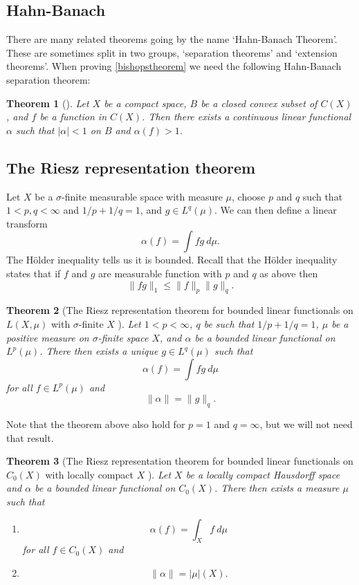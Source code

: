 \documentclass[a4paper,12pt,twoside,BCOR=10mm]{scrbook}
\newtheorem{theorem}{Theorem}[section]
\theoremstyle{definition}
\theoremstyle{definition}
\theoremstyle{definition}
\begin{document}
\subsection{Hahn-Banach}
There are many related theorems going by the name `Hahn-Banach Theorem'.
These are sometimes split in two groups, `separation theorems' and `extension theorems'.
When proving \ref{bishopstheorem} we need the following Hahn-Banach separation theorem:
\begin{theorem}[\citep{pryce}]
Let
	$X$ be a compact space,
	$B$ be a closed convex subset of $C(X)$,
	and $f$ be a function in $C(X)$.
Then there exists a continuous linear functional $\alpha$ such that $|\alpha| < 1$ on $B$ and $\alpha(f) > 1$.
\end{theorem}
\subsection{The Riesz representation theorem}
Let $X$ be a $\sigma$-finite measurable space with measure $\mu$, choose $p$ and $q$ such that $1 < p, q < \infty$ and $1/p + 1/q = 1$, and $g \in L^q(\mu)$.
We can then define a linear transform
\[
	\alpha(f) = \int fg\ d\mu.
\]
The Hölder inequality tells us it is bounded.
Recall that the Hölder inequality states that if $f$ and $g$ are measurable function with $p$ and $q$ as above then
\[
	\|fg\|_1 \leq \|f\|_p\|g\|_q.
\]
\begin{theorem}[The Riesz representation theorem for bounded linear functionals on $L(X, \mu)$ with $\sigma$-finite $X$ \citep{rudin2}]
Let $1 < p < \infty$,
	$q$ be such that $1/p + 1/q = 1$,
	$\mu$ be a positive measure on $\sigma$-finite space $X$,
	and $\alpha$ be a bounded linear functional on $L^p(\mu)$.
There then exists a unique $g \in L^q(\mu)$ such that
\[
	\alpha(f) = \int fg\ d\mu
\]
for all $f \in L^p(\mu)$ and
\[
	\|\alpha\| = \|g\|_q.
\]
\end{theorem}
Note that the theorem above also hold for $p = 1$ and $q = \infty$, but we will not need that result.

\begin{theorem}[The Riesz representation theorem for bounded linear functionals on $C_0(X)$ with locally compact $X$ \citep{rudin2}]
\label{riesz}
Let $X$ be a locally compact Hausdorff space and $\alpha$ be a bounded linear functional on $C_0(X)$.
There then exists a measure $\mu$ such that
\begin{enumerate}
\item[\emph{(i)}]
\[
	\alpha(f) = \int_X f\ d\mu
\]
for all $f \in C_0(X)$ and
\item[\emph{(ii)}]
\[
	\|\alpha\| = |\mu|(X).
\]
\end{enumerate}
\end{theorem}
\end{document}
